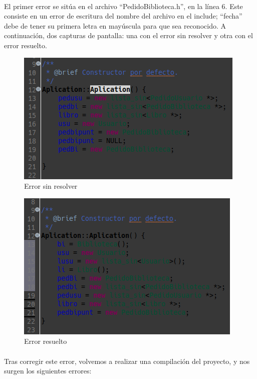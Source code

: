 \paragraph{}El primer error se sitúa en el archivo “PedidoBiblioteca.h”, en la línea 6. Este consiste en un error de escritura del nombre del archivo en el include; “fecha” debe de tener su primera letra en mayúscula para que sea reconocido. A continuación, dos capturas de pantalla: una con el error sin resolver y otra con el error resuelto.

\begin{figure}[H]
	\centering
	\includegraphics[scale=1]{img/captura3.png}
	\caption{Error sin resolver}
	\label{captura3}
\end{figure}

\begin{figure}[H]
	\centering
	\includegraphics[scale=1]{img/captura4.png}
	\caption{Error resuelto}
	\label{captura4}
\end{figure}

\paragraph{}Tras corregir este error, volvemos a realizar una compilación del proyecto, y nos surgen los siguientes errores:

